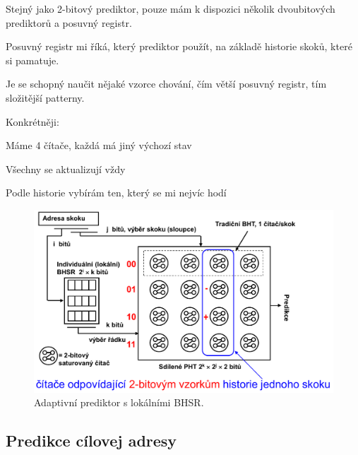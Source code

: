 \begin{compactitem}
    \item Stejný jako 2-bitový prediktor, pouze mám k dispozici několik dvoubitových prediktorů a posuvný registr.
    \item Posuvný registr mi říká, který prediktor použít, na základě historie skoků, které si pamatuje.
    \item Je se schopný naučit nějaké vzorce chování, čím větší posuvný registr, tím složitější patterny.
    \item Konkrétněji: \begin{compactitem}
        \item Máme 4 čítače, každá má jiný výchozí stav
        \item Všechny se aktualizují vždy
        \item Podle historie vybírám ten, který se mi nejvíc hodí
    \end{compactitem}

    \begin{figure}[H]
        \centering
        \includegraphics[width=0.85\linewidth]{prediktor_adaptivni.pdf}
        \caption{Adaptivní prediktor s lokálními BHSR.}
    \end{figure}
\end{compactitem}

\subsection{Predikce cílovej adresy}

